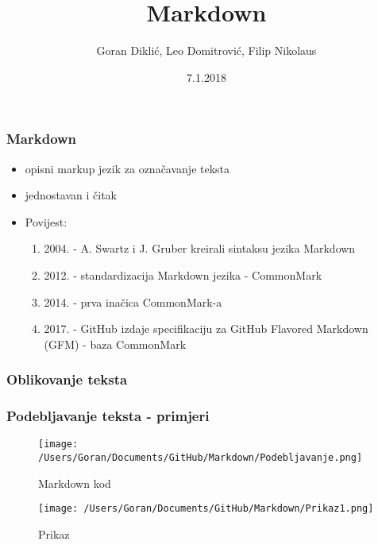 \documentclass{beamer}
\title{Markdown}
\author{Goran Diklić, Leo Domitrović, Filip Nikolaus}
\date{7.1.2018}
\begin{document}
\maketitle

\newpage

\begin{frame}
\frametitle{Markdown}

\begin{itemize}
\item opisni markup jezik za označavanje teksta
\item jednostavan i čitak
\item Povijest:
\begin{enumerate}
\item 2004. - A. Swartz i J. Gruber kreirali sintaksu jezika Markdown
\item 2012. - standardizacija Markdown jezika - CommonMark
\item 2014. - prva inačica CommonMark-a
\item 2017. - GitHub izdaje specifikaciju za GitHub Flavored Markdown
(GFM) - baza CommonMark
\end{enumerate}

	
\end{itemize}
\end{frame}

\newpage

\begin{frame}
\frametitle{Oblikovanje teksta}
\end{frame}

\newpage

\begin{frame}
\frametitle{Podebljavanje teksta - primjeri}

\begin{figure}
\caption{Markdown kod}
\texttt{[image: /Users/Goran/Documents/GitHub/Markdown/Podebljavanje.png]}
\end{figure}

\begin{figure}
\caption{Prikaz}
\texttt{[image: /Users/Goran/Documents/GitHub/Markdown/Prikaz1.png]}
\end{figure}

\end{frame}
\end{document}
